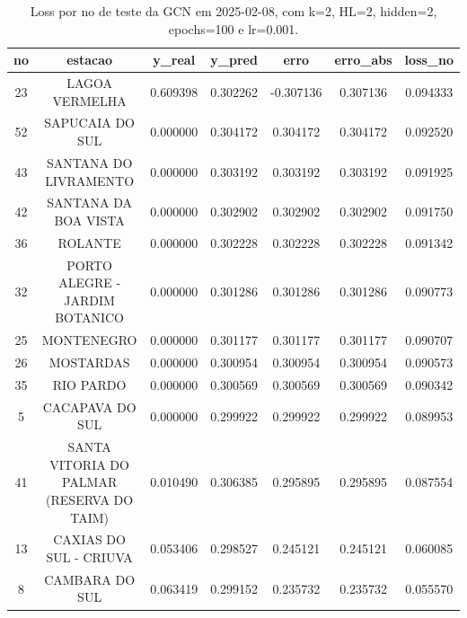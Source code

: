 \begin{table}[h]
\centering
\caption{Loss por no de teste da GCN em 2025-02-08, com k=2, HL=2, hidden=2, epochs=100 e lr=0.001.}
\label{tab:gcn_loss_k2_hl2_h2_e100_d20250208}
\begin{tabular}{ccccccc}
\toprule
no & estacao & y\_real & y\_pred & erro & erro\_abs & loss\_no \\
\midrule
23 & LAGOA VERMELHA & 0.609398 & 0.302262 & -0.307136 & 0.307136 & 0.094333 \\
52 & SAPUCAIA DO SUL & 0.000000 & 0.304172 & 0.304172 & 0.304172 & 0.092520 \\
43 & SANTANA DO LIVRAMENTO & 0.000000 & 0.303192 & 0.303192 & 0.303192 & 0.091925 \\
42 & SANTANA DA BOA VISTA & 0.000000 & 0.302902 & 0.302902 & 0.302902 & 0.091750 \\
36 & ROLANTE & 0.000000 & 0.302228 & 0.302228 & 0.302228 & 0.091342 \\
32 & PORTO ALEGRE - JARDIM BOTANICO & 0.000000 & 0.301286 & 0.301286 & 0.301286 & 0.090773 \\
25 & MONTENEGRO & 0.000000 & 0.301177 & 0.301177 & 0.301177 & 0.090707 \\
26 & MOSTARDAS & 0.000000 & 0.300954 & 0.300954 & 0.300954 & 0.090573 \\
35 & RIO PARDO & 0.000000 & 0.300569 & 0.300569 & 0.300569 & 0.090342 \\
5 & CACAPAVA DO SUL & 0.000000 & 0.299922 & 0.299922 & 0.299922 & 0.089953 \\
41 & SANTA VITORIA DO PALMAR (RESERVA DO TAIM) & 0.010490 & 0.306385 & 0.295895 & 0.295895 & 0.087554 \\
13 & CAXIAS DO SUL - CRIUVA & 0.053406 & 0.298527 & 0.245121 & 0.245121 & 0.060085 \\
8 & CAMBARA DO SUL & 0.063419 & 0.299152 & 0.235732 & 0.235732 & 0.055570 \\
\bottomrule
\end{tabular}
\end{table}
